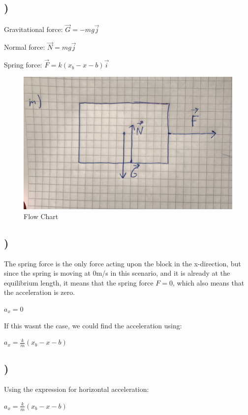 \documentclass[a4paper,10pt,norsk]{article}
\begin{document}
\subsection{)}

Gravitational force: $\vec{G} = -mg\vec{j}$

Normal force: $\vec{N} = mg\vec{j}$

Spring force: $\vec{F} = k(x_{b} - x - b)\vec{i}$

\begin{figure}[h!]
        \centering 
        \includegraphics[scale=0.5]{oppg_m.png} 
        \caption{Flow Chart}
\end{figure}

\subsection{)}
The spring force is the only force acting upon the block in the x-direction, but since the spring is moving at 0m/s in this scenario, and it is already at the equilibrium length, it means that the spring force $F = 0$, which also means that the acceleration is zero.

$a_{x} = 0$

If this wasnt the case, we could find the acceleration using:

$a_{x} = \frac{k}{m}(x_{b} - x - b)$


\subsection{)}
Using the expression for horizontal acceleration:

$a_{x} = \frac{k}{m}(x_{b} - x - b)$
\end{document}
